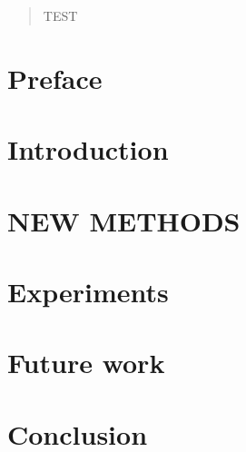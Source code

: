 \documentclass[12pt,twoside,onecolumn]{article}
\begin{document}
\newpage
\vspace*{\fill}
\begin{abstract}
TEST
\end{abstract}
\vspace*{\fill}
\newpage

\tableofcontents
\newpage

\section{Preface}
\newpage

\section{Introduction}



\newpage

\section{NEW METHODS}
\newpage

\section{Experiments}
\newpage

\section{Future work}
\newpage

\section{Conclusion}
\newpage





\end{document}
